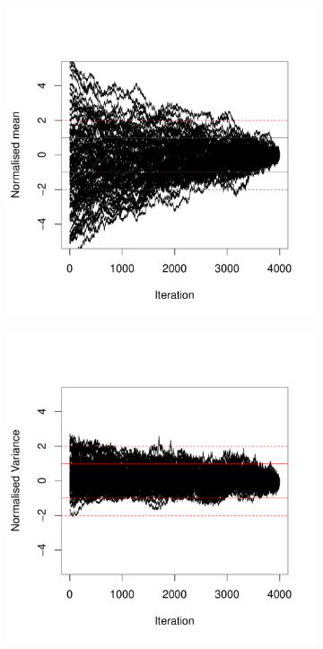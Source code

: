 \begin{figure}[H]
    \centering
    \begin{subfigure}[t]{0.45\textwidth}
    \centering
        \includegraphics[width=\textwidth]{background/Figures/BHM/AllMeanParticles.pdf}
        \caption{}
        \label{}
    \end{subfigure}
    \begin{subfigure}[t]{0.45\textwidth}
    \centering
      \includegraphics[width=\textwidth]{background/Figures/BHM/AllVarParticles.pdf}

\end{subfigure}
\end{figure}
